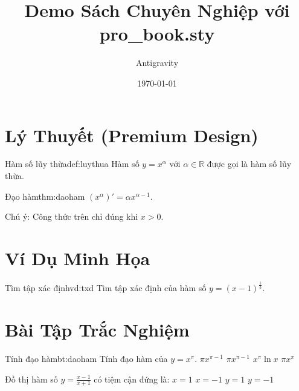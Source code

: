 \documentclass{article}
\title{Demo Sách Chuyên Nghiệp với pro\_book.sty}
\author{Antigravity}
\date{\today}
\begin{document}
\maketitle
\tableofcontents
\StartProBook

\section{Lý Thuyết (Premium Design)}

\begin{dn}{Hàm số lũy thừa}{def:luythua}
    Hàm số $y=x^\alpha$ với $\alpha \in \mathbb{R}$ được gọi là hàm số lũy thừa.
\end{dn}

\begin{dl}{Đạo hàm}{thm:daoham}
    $(x^\alpha)' = \alpha x^{\alpha-1}$.
\end{dl}

\begin{note}
    Chú ý: Công thức trên chỉ đúng khi $x > 0$.
\end{note}

\section{Ví Dụ Minh Họa}

\begin{vd}{Tìm tập xác định}{vd:txd}
    Tìm tập xác định của hàm số $y=(x-1)^{\frac{1}{3}}$.
\end{vd}

\section{Bài Tập Trắc Nghiệm}

\begin{bt}{Tính đạo hàm}{bt:daoham}
    Tính đạo hàm của $y=x^{\pi}$.
    \choice
    {$\pi x^{\pi-1}$}
    {\True $\pi x^{\pi-1}$}
    {$x^{\pi} \ln x$}
    {$\pi x^{\pi}$}
\end{bt}

\begin{ex}
    Đồ thị hàm số $y=\frac{x-1}{x+1}$ có tiệm cận đứng là:
    \choice
    {$x=1$}
    {\True $x=-1$}
    {$y=1$}
    {$y=-1$}
\end{ex}
\end{document}
